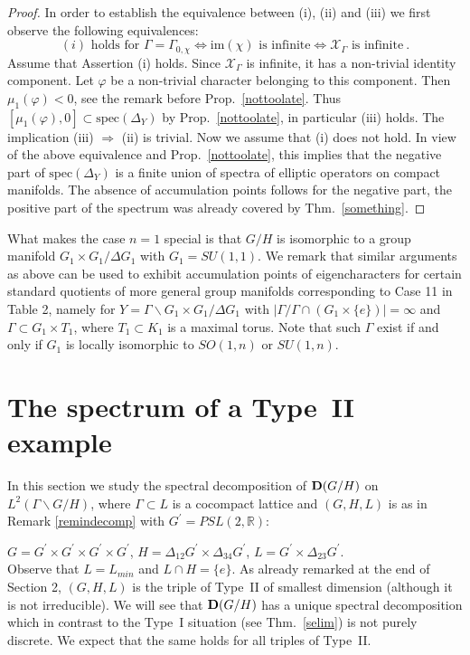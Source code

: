 \documentclass[10]{amsart}
\theoremstyle{remark}
\theoremstyle{definition}
\numberwithin{equation}{section}
\newcommand{\spec}{{\mathrm{spec}}}
\newcommand{\vp}{\varphi}
\newcommand{\Cal}{\mathcal}
\begin{document}
{\begin{proof}
In order to establish the equivalence between (i), (ii) and (iii) we first observe the following equivalences:
$$
(i) \mbox{ holds for } \Gamma=\Gamma_{0,\chi} \Leftrightarrow  \mathrm{im} (\chi)\mbox{ is infinite}  \Leftrightarrow {\Cal X}_\Gamma \mbox{ is infinite}\ .$$
Assume that Assertion (i) holds. Since ${\Cal X}_\Gamma$  is infinite, it  has a non-trivial identity component. Let $\vp$ be a non-trivial character belonging to this component. Then 
$\mu_1(\vp)<0$, see the remark  before Prop.~\ref{nottoolate}.
Thus $[\mu_1(\vp),0]\subset\spec(\Delta_Y)$ by  Prop.~\ref{nottoolate}, in particular (iii) holds. The implication (iii) $\Rightarrow$ (ii) is trivial. Now we assume that (i) does not hold. 
In view of the above equivalence and Prop.~\ref{nottoolate}, this implies that the negative part of $\spec(\Delta_Y)$ is a finite union of spectra of elliptic operators on compact manifolds.
The absence of accumulation points follows for the negative part, the positive part of the spectrum was already covered by Thm.~\ref{something}. 
\end{proof}
What makes the case $n=1$ special is that $G/H$ is isomorphic to a group manifold $G_1\times G_1/\Delta G_1$ with $G_1=SU(1,1)$.
We remark that similar arguments as above can be used to exhibit accumulation points of eigencharacters for certain standard quotients of more general group manifolds corresponding to Case 11 in Table 2, namely
for $Y=  \Gamma\backslash G_1\times G_1/\Delta G_1$ with 
$|\Gamma/\Gamma\cap(G_1\times\{e\})|=\infty$ and $\Gamma\subset G_1\times T_1$, where $T_1\subset K_1$ is a maximal torus. Note that such $\Gamma$ exist if and only if $G_1$ is locally isomorphic to $SO(1,n)$ or $SU(1,n)$.

\section{The spectrum of a Type~II example}\label{infinitemulti}

In this section we study the spectral decomposition of ${\bf D}(G/H)$ on $L^2(\Gamma\backslash G/H)$, where $\Gamma\subset L$ is a cocompact lattice and 
$(G,H,L)$ is as in Remark \ref{remindecomp} with $G^\prime=PSL(2,\mathbb{R})$:

$G=G^\prime\times G^\prime\times G^\prime\times G^\prime$, $H=\Delta_{12} G^\prime \times\Delta_{34} G^\prime$, $L=G^\prime\times\Delta_{23} G^\prime$.\\
Observe that $L=L_{min}$ and $L\cap H=\{e\}$. As already remarked at the end of Section 2, $(G,H,L)$ is the triple of Type~II of smallest dimension (although it is not irreducible). We will see that ${\bf D}(G/H)$ has a unique spectral decomposition which in contrast to the Type~I situation (see Thm.~\ref{selim}) is not purely discrete. We expect that the same holds for all
triples of Type~II.

}
\end{document}
